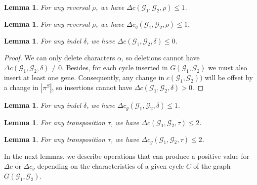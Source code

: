 \documentclass[12pt]{article}
\newtheorem{lemma}[theorem]{Lemma}
\begin{document}
\vspace{8pt}
\begin{lemma}\cite[Theorem 1]{1996-bafna-pevzner}\label{lemma:lb_r_c}
For any reversal $\rho$, we have $\Delta c(\mathcal{G}_1,\mathcal{G}_2,\rho) \le 1$.
\end{lemma}

\vspace{8pt}
\begin{lemma}\cite[Lemma 2]{2021b-alexandrino-etal}\label{lemma:lb_r_cg}
For any reversal $\rho$, we have $\Delta c_g(\mathcal{G}_1,\mathcal{G}_2,\rho) \le 1$.
\end{lemma}

\vspace{8pt}
\begin{lemma}\label{lemma:lb_d_c}
For any indel $\delta$, we have $\Delta c(\mathcal{G}_1,\mathcal{G}_2,\delta) \le 0$.
\end{lemma}

\begin{proof}
We can only delete characters $\alpha$, so deletions cannot have $\Delta c(\mathcal{G}_1,\mathcal{G}_2,\delta) \neq 0$. Besides, for each cycle inserted in $G(\mathcal{G}_1,\mathcal{G}_2)$ we must also insert at least one gene. Consequently, any change in $c(\mathcal{G}_1,\mathcal{G}_2))$ will be offset by a change in $|\pi^S|$, so insertions cannot have $\Delta c(\mathcal{G}_1,\mathcal{G}_2,\delta) > 0$.
\end{proof}

\vspace{8pt}
\begin{lemma}\cite[Lemma 3]{2021b-alexandrino-etal}\label{lemma:lb_d_cg}
For any indel $\delta$, we have $\Delta c_g(\mathcal{G}_1,\mathcal{G}_2,\delta) \le 1$.
\end{lemma}

\vspace{8pt}
\begin{lemma}\cite[Lemma 2.1]{1998-bafna-pevzner}\label{lemma:lb_t_c}
For any transposition $\tau$, we have $\Delta c(\mathcal{G}_1,\mathcal{G}_2,\tau) \le 2$.
\end{lemma}

\vspace{8pt}
\begin{lemma}\cite[Lemma 2]{2023b-alexandrino-etal}\label{lemma:lb_t_cg}
For any transposition $\tau$, we have $\Delta c_g(\mathcal{G}_1,\mathcal{G}_2,\tau) \le 2$.
\end{lemma}

In the next lemmas, we describe operations that can produce a positive value for $\Delta c$ or $\Delta c_g$ depending on the characteristics of a given cycle $C$ of the graph $G(\mathcal{G}_1,\mathcal{G}_2)$.
\end{document}
